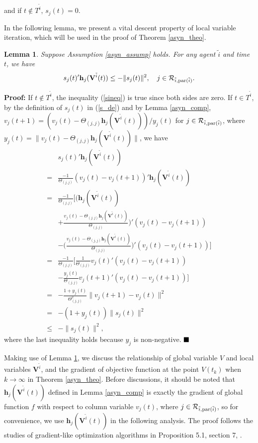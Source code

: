 \documentclass[journal]{IEEEtran}
\newtheorem{lemma}{Lemma}[section]
\begin{document}
 and if $t\notin T^{\tilde{i}}$, $s_j(t)=0$.
\par In the following lemma, we present a vital descent property of local variable iteration, which will be used in the proof of Theorem \ref{asyn_theo}.
\begin{lemma}\label{coor_descent}
	Suppose Assumption \ref{asyn_assump} holds. For any agent $\tilde{i}$ and time $t$, we have
	\begin{align}\label{sineq}
	s_j(t)'\mathbf{h}_j(\mathbf{V}^{\tilde{i}}(t))\leq -\|s_j(t)\|^2, \quad j\in \mathcal{R}_{\tilde{i},{\rm par}(\tilde{i})}.
	\end{align}
\end{lemma}
\textbf{Proof:}
If $t\notin T^{\tilde{i}}$, the inequality (\ref{sineq}) is true since both sides are zero. If $t\in T^{\tilde{i}}$, by the definition of $s_j(t)$ in (\ref{s_de}) and by Lemma \ref{asyn_comp}, $v_j(t+1)=(v_j(t)-\Theta_{(j,j)}\mathbf{h}_j(\mathbf{V}^{\tilde{i}}(t)))/y_j(t)$ for $j\in \mathcal{R}_{\tilde{i},{\rm par}(\tilde{i})}$, where $y_j(t)=\|v_j(t)-\Theta_{(j,j)}\mathbf{h}_j(\mathbf{V}^{\tilde{i}}(t))\|$, we have
\begin{align*}
&s_j(t)'\mathbf{h}_j(\mathbf{V}^{\tilde{i}}(t))\\
=& \frac{-1}{\Theta_{(j,j)}}(v_j(t)-v_j(t+1))'\mathbf{h}_j(\mathbf{V}^{\tilde{i}}(t))\\
=& \frac{-1}{\Theta_{(j,j)}} \bigg[\Big(\mathbf{h}_j(\mathbf{V}^{\tilde{i}}(t))\\
&+\frac{v_j(t)-\Theta_{(j,j)}\mathbf{h}_j(\mathbf{V}^{\tilde{i}}(t))}{\Theta_{(j,j)}}\Big)'(v_j(t)-v_j(t+1))\\
&-\Big(\frac{v_j(t)-\Theta_{(j,j)}\mathbf{h}_j(\mathbf{V}^{\tilde{i}}(t))}{\Theta_{(j,j)}}\Big)' (v_j(t)-v_j(t+1)) \bigg]\\
=&  \frac{-1}{\Theta_{(j,j)}} \bigg[\frac{1}{\Theta_{(j,j)}} v_j(t)'(v_j(t)-v_j(t+1))\\
&-\frac{y_j(t)}{\Theta_{(j,j)}} v_j(t+1)'(v_j(t)-v_j(t+1))\bigg]\\
=& -\frac{1+y_j(t)}{\Theta_{(j,j)}^2}\|v_j(t+1)-v_j(t)\|^2\\
=&-(1+y_j(t))\|s_j(t)\|^2\\
\leq &-\|s_j(t)\|^2,
\end{align*}
where the last inequality holds because $y_j$ is non-negative.
$\hfill\blacksquare$
\par Making use of Lemma \ref{coor_descent}, we discuss the relationship of global variable $V$ and local variables $\mathbf{V}^{\tilde{i}}$, and the gradient of objective function at the point $V(t_k)$ when $k \to \infty$ in Theorem \ref{asyn_theo}. Before discussions, it should be noted that $\mathbf{h}_j(\mathbf{V}^{\tilde{i}}(t))$ defined in Lemma \ref{asyn_comp} is exactly the gradient of global function $f$ with respect to column variable $v_j(t)$, where $j\in \mathcal{R}_{\tilde{i},{\rm par}(\tilde{i})}$, so for convenience, we use $\mathbf{h}_j(\mathbf{V}^{\tilde{i}}(t))$ in the following analysis. The proof follows the studies of gradient-like optimization algorithms in Proposition 5.1, section 7, \cite{paral_distri_book}.
\end{document}
